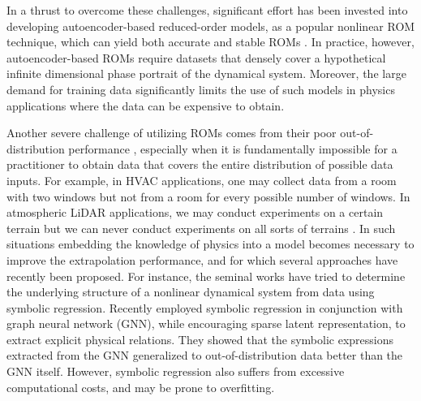         
        In a thrust to overcome these challenges, significant effort has been invested into developing autoencoder-based reduced-order models, as a popular nonlinear ROM technique, which can yield both accurate and stable ROMs \citep{lee2020model,gin2021deep,champion2019data,kim2019deep}. In practice, however, autoencoder-based ROMs require datasets that densely cover a hypothetical infinite dimensional phase portrait of the dynamical system. Moreover, the large demand for training data significantly limits the use of such models in physics applications where the data can be expensive to obtain.
    

        Another severe challenge of utilizing ROMs comes from their poor out-of-distribution performance \citep{fries2022lasdi,cranmer2020discovering,gin2021deep}, especially when it is fundamentally impossible for a practitioner to obtain data that covers the entire distribution of possible data inputs. For example, in HVAC applications, one may collect data from a room with two windows but not from a room for every possible number of windows. In atmospheric LiDAR applications, we may conduct experiments on a certain terrain but we can never conduct experiments on all sorts of terrains \citep{nabi2020improving}. In such situations embedding the knowledge of physics into a model becomes necessary to improve the extrapolation performance, and for which several approaches have recently been proposed.
        For instance, the seminal works \citep{bongard2007automated,schmidt2009distilling} have tried to determine the underlying structure of a nonlinear dynamical system from data using symbolic regression. Recently \citep{cranmer2020discovering} employed symbolic regression in conjunction with graph neural network (GNN), while encouraging sparse latent representation, to extract explicit physical relations. They showed that the symbolic expressions extracted from the GNN generalized to out-of-distribution data better than the GNN itself. However, symbolic regression also suffers from excessive computational costs,  and may be prone to overfitting.

      

